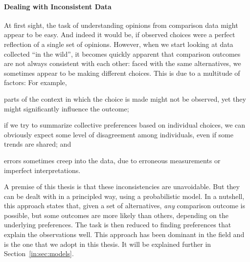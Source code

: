 \paragraph{Dealing with Inconsistent Data}
At first sight, the task of understanding opinions from comparison data might appear to be easy.
And indeed it would be, if observed choices were a perfect reflection of a single set of opinions.
However, when we start looking at data collected ``in the wild'', it becomes quickly apparent that comparison outcomes are not always consistent with each other:
faced with the same alternatives, we sometimes appear to be making different choices.
This is due to a multitude of factors:
For example,
\begin{enuminline}
\item parts of the context in which the choice is made might not be observed, yet they might significantly influence the outcome;
\item if we try to summarize collective preferences based on individual choices, we can obviously expect some level of disagreement among individuals, even if some trends are shared; and
\item errors sometimes creep into the data, due to erroneous measurements or imperfect interpretations.
\end{enuminline}
A premise of this thesis is that these inconsistencies are unavoidable.
But they can be dealt with in a principled way, using a probabilistic model.
In a nutshell, this approach states that, given a set of alternatives, \emph{any} comparison outcome is possible, but some outcomes are more likely than others, depending on the underlying preferences.
The task is then reduced to finding preferences that explain the observations well.
This approach has been dominant in the field and is the one that we adopt in this thesis.
It will be explained further in Section~\ref{in:sec:models}.

